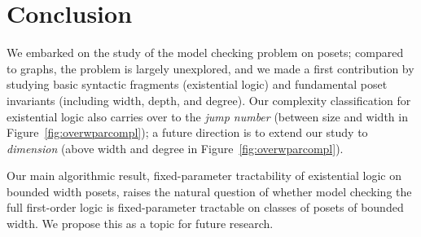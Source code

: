 \documentclass[usletter]{article}
\newcommand{\longversion}[1]{#1}
\newcommand{\shortversion}[1]{}
\begin{document}
\section{Conclusion}\label{sect:concl}

We embarked on the study of the model checking problem 
on 
posets; compared to graphs, 
the problem is largely unexplored, and we made a first contribution 
by studying basic syntactic fragments (existential logic) 
and fundamental poset invariants (including width, depth, and degree).  
Our complexity classification for existential logic also carries over to the \emph{jump number} 
(between size and width in Figure~\ref{fig:overwparcompl}); a future direction is to extend our study to \emph{dimension} 
(above width \cite{CaspardLeclercMonjardet12} and degree \cite{FurediKahn86} in Figure~\ref{fig:overwparcompl}).


Our main algorithmic result, fixed-parameter tractability of existential logic on bounded width posets, 
raises the natural question of whether model checking the full first-order logic 
is fixed-parameter tractable on classes of posets of bounded width. 
We propose this as a topic for future research.  










\shortversion{\acks

This research was supported by ERC Starting Grant (Complex Reason, 239962) 
and FWF Austrian Science Fund (Parameterized Compilation, P26200).}







\longversion{\newpage}
\end{document}
